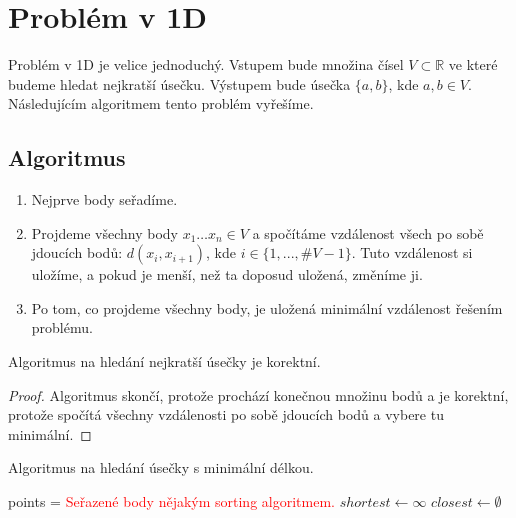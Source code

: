 \chapter{Problém v 1D}
\label{chap:problem_1D}
Problém v 1D je velice jednoduchý. Vstupem bude množina čísel $V \subset \mathbb{R}$ ve které budeme hledat nejkratší úsečku. Výstupem bude úsečka $\{a, b\}$, kde $ a, b \in V$. Následujícím algoritmem tento problém vyřešíme.

\section{Algoritmus}
\label{sec:algoritmus_1D}
\begin{enumerate}
    \item Nejprve body seřadíme.
    \item Projdeme všechny body $x_1\ldots x_n \in V$ a spočítáme vzdálenost všech po sobě jdoucích bodů: $d(x_i, x_{i+1})$, kde $i \in \{1,...,\#V-1\}$. Tuto vzdálenost si uložíme, a pokud je menší, než ta doposud uložená, změníme ji. 
    \item Po tom, co projdeme všechny body, je uložená minimální vzdálenost řešením problému. 
\end{enumerate}
\begin{tvrzeni}
    Algoritmus na hledání nejkratší úsečky je korektní.
\end{tvrzeni}
\begin{proof}
    Algoritmus skončí, protože prochází konečnou množinu bodů a je korektní, protože spočítá všechny vzdálenosti po sobě jdoucích bodů a vybere tu minimální. 
\end{proof}
\begin{algorithm}
    \caption{Algoritmus na hledání úsečky s minimální délkou.}
    \label{alg:algoritmus_1D}

   
    \BlankLine
    points = \textcolor{red}{Seřazené body nějakým sorting algoritmem.} \;
    $shortest \leftarrow \infty$ \;
    $ closest \leftarrow \emptyset $ \;
\end{algorithm}